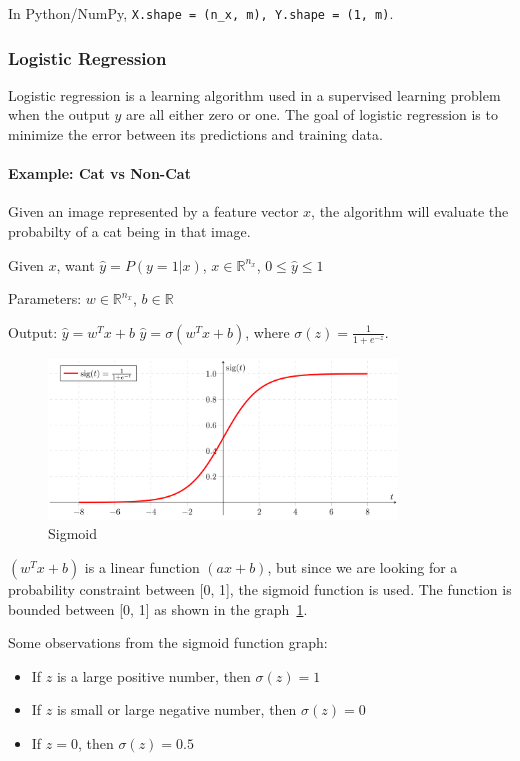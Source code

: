 \documentclass[UTF8]{article}
\newcommand{\Vector}[1]{\boldsymbol{\mathit{#1}}}   %
\newcommand{\Set}[1]{\mathbb{#1}}                   %
\begin{document}
In Python/NumPy, \texttt{X.shape = (n_x, m), Y.shape = (1, m)}.

\subsubsection{Logistic Regression}
Logistic regression is a learning algorithm used in a supervised learning problem when the output
$y$ are all either zero or one. The goal of logistic regression is to minimize the error between
its predictions and training data.

\paragraph{Example: Cat vs Non-Cat}
Given an image represented by a feature vector $\Vector{x}$, the algorithm will evaluate the
probabilty of a cat being in that image.

Given $\Vector{x}$, want $\hat{y} = P(y=1|\Vector{x})$, $\Vector{x} \in \Set{R}^{n_x}$, $0 \leq
\hat{y} \leq 1$

Parameters: $\Vector{w} \in \Set{R}^{n_x}$, $b \in \Set{R}$

Output: \sout{$\hat{y} = \Vector{w}^T \Vector{x} + b$} \quad
$\hat{y} = \sigma (\Vector{w}^T\Vector{x} + b)$, where $\sigma(z) = \frac{1}{1+e^{-z}}$.
\begin{figure}[htb]
    \centering
    \includegraphics[width=25em]{figures/sigmoid}
    \caption{Sigmoid}
    \label{fig:sigmoid}
\end{figure}

$(\Vector{w}^T\Vector{x} + b)$ is a linear function $(a\Vector{x} + b)$, but since we are looking
for a probability constraint between [0, 1], the sigmoid function is used. The function is bounded
between [0, 1] as shown in the graph~\ref{fig:sigmoid}.

Some observations from the sigmoid function graph:
\begin{itemize}
    \item If $z$ is a large positive number, then $\sigma(z) = 1$
    \item If $z$ is small or large negative number, then $\sigma(z) = 0$
    \item If $z = 0$, then $\sigma(z) = 0.5$
\end{itemize}
\end{document}
